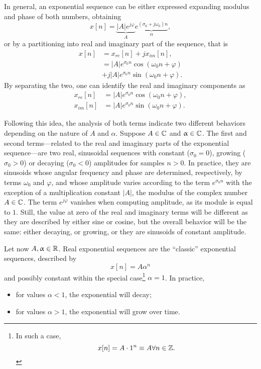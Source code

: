 \documentclass[\documentfontsize, twocolumn]{\classname}
\begin{document}
In general, an exponential se\-quen\-ce can be either expressed expanding modulus and phase of both numbers, obtaining \[x[n] = \underbrace{|A|e^{j\varphi}}_{A}\underbrace{e^{(\sigma_0 + j\omega_0)n}}_{\alpha},\] or by a partitioning into real and imaginary part of the se\-quen\-ce, that is 
\begin{align*}
    x[n] &= x_{re}[n] + jx_{im}[n],\\
         &= |A|e^{\sigma_0n}\cos{(\omega_0 n + \varphi)} \\
         &+ j|A|e^{\sigma_0n}\sin{(\omega_0 n + \varphi)}.
\end{align*}
By separating the two, one can identify the real and imaginary components as
\begin{align}
    x_{re}[n] & = |A|e^{\sigma_0n}\cos{(\omega_0 n + \varphi)},\\
    x_{im}[n] & = |A|e^{\sigma_0n}\sin{(\omega_0 n + \varphi)}.
\end{align}

Following this idea, the analysis of both terms indicate two different behaviors depending on the nature of $A$ and $\alpha$. Suppose $A \in \mathbb C$ and $\upalpha \in \mathbb C$. The first and second terms---related to the real and imaginary parts of the exponential se\-quen\-ce---are two real, sinusoidal se\-quen\-ces with constant ($\sigma_0 = 0$), growing ($\sigma_0 > 0$) or decaying ($\sigma_0 < 0$) amplitudes for samples $n > 0$. In practice, they are sinusoids whose angular frequency and phase are determined, respectively, by terms $\omega_0$ and $\varphi$, and whose amplitude varies according to the term $e^{\sigma_0n}$ with the exception of a multiplication constant $|A|$, the modulus of the complex number $A \in \mathbb C$. The term $e^{j\varphi}$ vanishes when computing amplitude, as its module is equal to $1$. Still, the value at zero of the real and imaginary terms will be different as they are described by either sine or cosine, but the overall behavior will be the same: either decaying, or growing, or they are sinusoids of constant amplitude.

Let now $A,\upalpha \in \mathbb R$. Real exponential se\-quen\-ces are the ``classic'' exponential se\-quen\-ces, described by \[x[n] = A\alpha^n\] and possibly constant within the special case\footnote{
    In such a case, \[x[n] = A\cdot 1^n \equiv A \forall n \in \mathbb Z.\]
} $\alpha=1$. In practice,
\begin{itemize}
    \item for values $\alpha < 1$, the exponential will decay;
    \item for values $\alpha > 1$, the exponential will grow over time.
\end{itemize}
\end{document}

